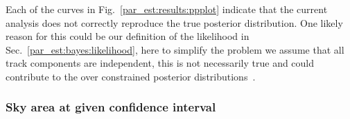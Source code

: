 Each of the curves in Fig.~\ref{par_est:results:ppplot} indicate that the
current analysis does not correctly reproduce the true posterior distribution.
One likely reason for this could be our definition of the likelihood in
Sec.~\ref{par_est:bayes:likelihood}, here to simplify the problem we assume
that all track components are independent, this is not necessarily true and
could contribute to the over constrained posterior
distributions~. 

%
%
\subsubsection{\label{par_est:results:simulations:skyarea}Sky area at given confidence interval}
%
%

